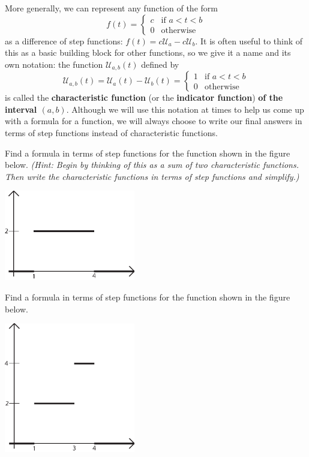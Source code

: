 {More generally, we can represent any function of the form 
\[f(t) = \begin{cases} c & \mbox{if } a < t < b \\ 0 & \mbox{otherwise} \end{cases}\] 
as a difference of step functions: $f(t) = c\mathcal{U}_a - c \mathcal{U}_b$.  It is often useful to think of this as a basic building block for other functions, so we give it a name and its own notation: the function $\mathcal{U}_{a,b}(t)$ defined by 
\[ \mathcal{U}_{a,b}(t) = \mathcal{U}_a(t) - \mathcal{U}_b(t) = \begin{cases} 1 & \mbox{if } a < t < b \\ 0 & \mbox{otherwise} \end{cases}\]
is called the %
	{\bf characteristic function} (or the %
	{\bf indicator function}) {\bf of the interval $(a,b)$}.
Although we will use this notation at times to help us come up with a formula for a function, we will always choose to write our final answers in terms of step functions instead of characteristic functions.

\begin{exe} Find a formula in terms of step functions for the function shown in the figure below.  {\it (Hint: Begin by thinking of this as a sum of two characteristic functions.  Then write the characteristic functions in terms of step functions and simplify.)}
\begin{center}
\includegraphics[width=2.25in]{11-laplaceII/stepfunction6.eps}
\end{center}
\end{exe}

\begin{exe} Find a formula in terms of step functions for the function shown in the figure below.
\begin{center}
\includegraphics[width=2.25in]{11-laplaceII/stepfunction3.eps}
\end{center}
\end{exe}




}
